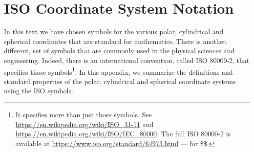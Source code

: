 \graphicspath{{figures/ISO/}}

\renewcommand{\theequation}{\thechapter.\arabic{equation}}
\renewcommand{\thetheorem}{\thechapter.\arabic{theorem}}
\renewcommand{\thebc}{\thechapter.\arabic{theorem}}
\renewcommand{\theeg}{\thechapter.\arabic{theorem}}


\chapter{ISO Coordinate System Notation}\label{ap:ISO}

In this text we have chosen symbols for the various polar, cylindrical and 
spherical coordinates that are standard for mathematics. There is 
another, different, set of symbols that are commonly used in the 
physical sciences and engineering. Indeed, there is an international convention, called ISO 80000-2, that specifies those symbols\footnote{It specifies more than just those symbols. See \url{https://en.wikipedia.org/wiki/ISO_31-11}
and \url{https://en.wikipedia.org/wiki/ISO/IEC_80000}. The full
ISO 80000-2 is available at \url{https://www.iso.org/standard/64973.html} --- for \$\$.}. In this appendix, we summarize the definitions and standard properties of the polar, cylindrical and spherical coordinate systems using the
ISO symbols.   

